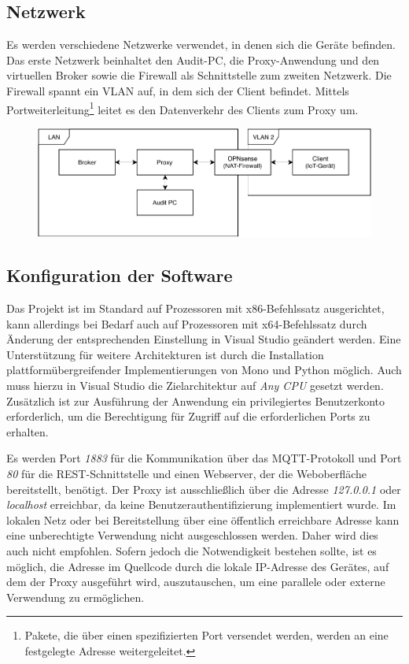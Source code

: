     \subsection{Netzwerk}
    Es werden verschiedene Netzwerke verwendet, in denen sich die Geräte befinden. 
    Das erste Netzwerk beinhaltet den Audit-PC, die Proxy-Anwendung und den virtuellen Broker sowie die Firewall als Schnittstelle zum zweiten Netzwerk.
    Die Firewall spannt ein \ac{VLAN} auf, in dem sich der Client befindet. Mittels Portweiterleitung\footnote{Pakete, die über einen spezifizierten Port versendet werden, werden an eine festgelegte Adresse weitergeleitet.} leitet es den Datenverkehr des Clients zum Proxy um.
    
    \begin{figure}[h]%
        \centering
        \includegraphics[width=14cm]{tex/bilder/6_validierung/Netzwerkdiagramm.pdf}
        \label{fig:virtuelles_netzwerk}
    \end{figure}
    
    \subsection{Konfiguration der Software} \label{KonfigurationDerSoftware}
    Das Projekt ist im Standard auf Prozessoren mit x86-Befehlssatz ausgerichtet, kann allerdings bei Bedarf auch auf Prozessoren mit x64-Befehlssatz durch Änderung der entsprechenden Einstellung in Visual Studio geändert werden.
    Eine Unterstützung für weitere Architekturen ist durch die Installation plattformübergreifender Implementierungen von Mono und Python möglich. Auch muss hierzu in Visual Studio die Zielarchitektur auf \emph{Any CPU} gesetzt werden. 
    Zusätzlich ist zur Ausführung der Anwendung ein privilegiertes Benutzerkonto erforderlich, um die Berechtigung für Zugriff auf die erforderlichen Ports zu erhalten.
    
    Es werden Port \emph{1883} für die Kommunikation über das \ac{MQTT}-Protokoll und Port \emph{80} für die \ac{REST}-Schnittstelle und einen Webserver, der die Weboberfläche bereitstellt, benötigt.
    Der Proxy ist ausschließlich über die Adresse \emph{127.0.0.1} oder \emph{localhost} erreichbar, da keine Benutzerauthentifizierung implementiert wurde. Im lokalen Netz oder bei Bereitstellung über eine öffentlich erreichbare Adresse kann eine unberechtigte Verwendung nicht ausgeschlossen werden. Daher wird dies auch nicht empfohlen. Sofern jedoch die Notwendigkeit bestehen sollte, ist es möglich, die Adresse im Quellcode durch die lokale IP-Adresse des Gerätes, auf dem der Proxy ausgeführt wird, auszutauschen, um eine parallele oder externe Verwendung zu ermöglichen.

